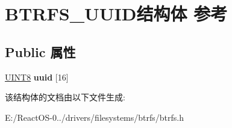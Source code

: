 \hypertarget{struct_b_t_r_f_s___u_u_i_d}{}\section{B\+T\+R\+F\+S\+\_\+\+U\+U\+I\+D结构体 参考}
\label{struct_b_t_r_f_s___u_u_i_d}
\subsection*{Public 属性}
\begin{DoxyCompactItemize}
\item 
\mbox{\label{struct_b_t_r_f_s___u_u_i_d_a2c8ecd800acd7f363f191db7ae2e4738}} 
\hyperlink{_processor_bind_8h_ab27e9918b538ce9d8ca692479b375b6a}{U\+I\+N\+T8} {\bfseries uuid} \mbox{[}16\mbox{]}
\end{DoxyCompactItemize}


该结构体的文档由以下文件生成\+:\begin{DoxyCompactItemize}
\item 
E\+:/\+React\+O\+S-\/0../drivers/filesystems/btrfs/btrfs.\+h\end{DoxyCompactItemize}
